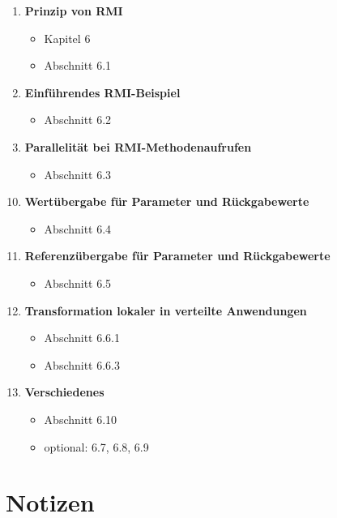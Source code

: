 \begin{tcolorbox}[colback=white!20,color=white]
\begin{enumerate}
        \item \textbf{Prinzip von RMI}
        \begin{itemize}
            \item[] Kapitel 6
            \item[] Abschnitt 6.1
        \end{itemize}

        \item \textbf{Einführendes RMI-Beispiel}
        \begin{itemize}
            \item[] Abschnitt 6.2
        \end{itemize}

        \item \textbf{Parallelität bei RMI-Methodenaufrufen}
        \begin{itemize}
            \item[] Abschnitt 6.3
        \end{itemize}
    \end{enumerate}
\end{tcolorbox}

\begin{tcolorbox}[colback=white!20,color=white]
    \begin{enumerate}
        \setcounter{enumi}{9}
    \item \textbf{Wertübergabe für Parameter und Rückgabewerte}
    \begin{itemize}
        \item[] Abschnitt 6.4
    \end{itemize}

    \item \textbf{Referenzübergabe für Parameter und Rückgabewerte}
    \begin{itemize}
        \item[] Abschnitt 6.5
    \end{itemize}

    \item \textbf{Transformation lokaler in verteilte Anwendungen}
    \begin{itemize}
        \item[] Abschnitt 6.6.1
        \item[] Abschnitt 6.6.3
    \end{itemize}

    \item \textbf{Verschiedenes}
    \begin{itemize}
        \item[] Abschnitt 6.10
        \item[] optional: 6.7, 6.8, 6.9
    \end{itemize}
    \end{enumerate}
\end{tcolorbox}

\newpage








\newpage
\section*{Notizen}

\newpage
